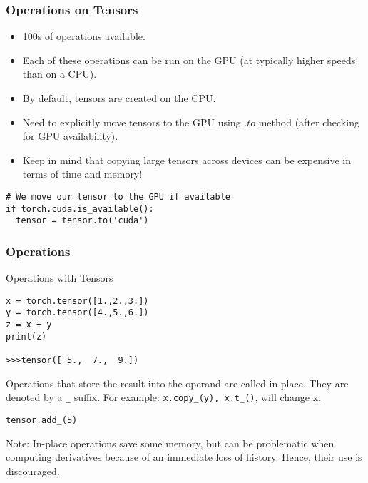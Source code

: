 \begin{frame}[fragile]
\frametitle{Operations on Tensors}
\begin{itemize}
\item 100s of operations available.
\item Each of these operations can be run on the GPU (at typically higher speeds than on a CPU).
\item By default, tensors are created on the CPU. 
\item Need to explicitly move tensors to the GPU using $.to$ method (after checking for GPU availability). 
\item Keep in mind that copying large tensors across devices can be expensive in terms of time and memory!
\end{itemize}

 \begin{lstlisting}
# We move our tensor to the GPU if available
if torch.cuda.is_available():
  tensor = tensor.to('cuda')
 \end{lstlisting}

 \end{frame} 
 
 
 
\begin{frame}[fragile]
\frametitle{Operations}
Operations with Tensors
 \begin{lstlisting}
x = torch.tensor([1.,2.,3.])
y = torch.tensor([4.,5.,6.])
z = x + y
print(z)

>>>tensor([ 5.,  7.,  9.])

 \end{lstlisting}
 
 Operations that store the result into the operand are called in-place. They are denoted by a \lstinline|_| suffix. For example: \lstinline|x.copy_(y), x.t_()|, will change x.
 
  \begin{lstlisting}
tensor.add_(5)
 \end{lstlisting}
 
 Note:  In-place operations save some memory, but can be problematic when computing derivatives because of an immediate loss of history. Hence, their use is discouraged.
 \end{frame} 
 
